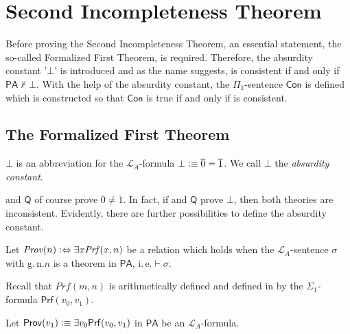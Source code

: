 \chapter{Second Incompleteness Theorem}

Before proving the Second Incompleteness Theorem, an essential statement, the so-called Formalized First Theorem, is required. Therefore, the absurdity constant '$\bot$' is introduced and as the name suggests, \PA is consistent if and only if $\mathsf{PA} \nvdash \bot$. With the help of the absurdity constant, the $\Pi_1$-sentence $\mathsf{Con}$ is defined which is constructed so that $\mathsf{Con}$ is true if and only if \PA is consistent. 

\section{The Formalized First Theorem}

\begin{dfn}
$\bot$ is an abbreviation for the $\mathcal{L}_A$-formula $\bot \vcentcolon \equiv \overline{0}= \overline{1}$. We call $\bot$ the \textit{absurdity constant}.
\end{dfn}

\PA and $\mathsf{Q}$ of course prove $\overline{0} \neq \overline{1}$. In fact, if \PA and $\mathsf{Q}$ prove $\bot$, then both theories are inconsistent. Evidently, there are further possibilities to define the absurdity constant. 

\begin{dfn}
Let $\mathit{Prov}(n) \vcentcolon \Leftrightarrow \exists x \mathit{Prf}(x,n)$ be a relation which holds when the $\mathcal{L}_A$-sentence $\sigma$ with g.\,n.\@ $n$ is a theorem in $\mathsf{PA}$, i.\,e.\@ \PA $\vdash \sigma$.
\end{dfn}

Recall that $\mathit{Prf}(m,n)$ is arithmetically defined and defined in \PA by the $\Sigma_1$-formula $\mathsf{Prf}(v_0,v_1)$.

\begin{dfn}
Let $\mathsf{Prov}(v_1) \vcentcolon \equiv \exists  v_0  \mathsf{Prf}(v_0,v_1)$ in $\mathsf{PA}$ be an $\mathcal{L}_A$-formula.
\end{dfn}

